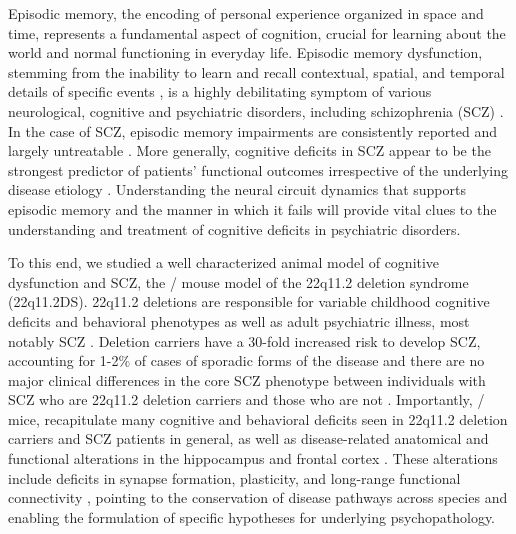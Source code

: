 Episodic memory, the encoding of personal experience organized in space and time, represents a fundamental aspect of cognition, crucial for learning about the world and normal functioning in everyday life. Episodic memory dysfunction, stemming from the inability to learn and recall contextual, spatial, and temporal details of specific events \citep{Dickerson2010, Eichenbaum2000}, is a highly debilitating symptom of various neurological, cognitive and psychiatric disorders, including schizophrenia (SCZ) \citep{Dere2010, Leavitt2009}. In the case of SCZ, episodic memory impairments are consistently reported \citep{Aleman1999, Schaefer2013} and largely untreatable \citep{Green1996, Ibrahim2011, Keefe2007}. More generally, cognitive deficits in SCZ appear to be the strongest predictor of patients' functional outcomes irrespective of the underlying disease etiology \citep{Green1996, Ranganath2008}. Understanding the neural circuit dynamics that supports episodic memory and the manner in which it fails will provide vital clues to the understanding and treatment of cognitive deficits in psychiatric disorders.

To this end, we studied a well characterized animal model of cognitive dysfunction and SCZ, the \df/ mouse model of the 22q11.2 deletion syndrome (22q11.2DS). 22q11.2 deletions are responsible for variable childhood cognitive deficits and behavioral phenotypes as well as adult psychiatric illness, most notably SCZ \citep{Biswas2016, Schneider2014}. Deletion carriers have a 30-fold increased risk to develop SCZ, accounting for 1-2$\%$ of cases of sporadic forms of the disease \citep{Karayiorgou2010, Xu2008} and there are no major clinical differences in the core SCZ phenotype between individuals with SCZ who are 22q11.2 deletion carriers and those who are not \citep{Bassett2003, Bassett1998}. Importantly, \df/ mice, recapitulate many cognitive and behavioral deficits seen in 22q11.2 deletion carriers and SCZ patients in general, as well as disease-related anatomical and functional alterations in the hippocampus and frontal cortex \citep{Glausier2013, Scariati2016, Schmitt2015, Schmitt2016, Spencer2004, Uhlhaas2010, Weinberger2016}. These alterations include deficits in synapse formation, plasticity, and long-range functional connectivity \citep{Drew2011b, Mukai2008, Stark2008, Fenelon2013, Mukai2015, Sigurdsson2010, Tamura2016}, pointing to the conservation of disease pathways across species and enabling the formulation of specific hypotheses for underlying psychopathology.

